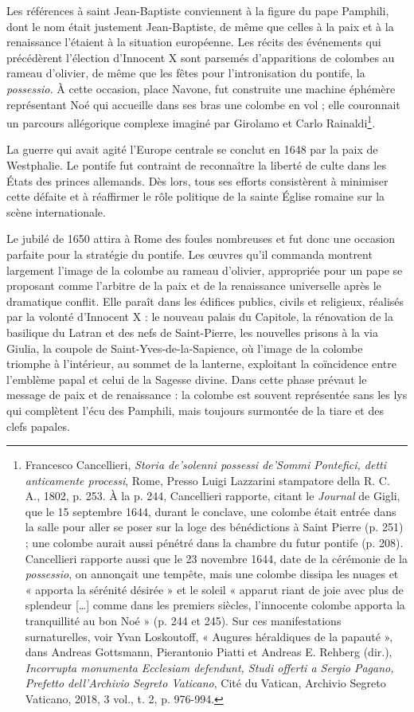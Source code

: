 \documentclass[12pt,twoside,openany]{book}
\begin{document}
Les références à saint Jean-Baptiste conviennent à la figure du pape Pamphili, dont le nom était justement Jean-Baptiste, de même que celles à la paix et à la renaissance l’étaient à la situation européenne. Les récits des événements qui précédèrent l’élection d’Innocent X sont parsemés d’apparitions de colombes au rameau d’olivier, de même que les fêtes pour l’intronisation du pontife, la \textit{possessio. }À cette occasion, place Navone, fut construite une machine éphémère représentant Noé qui accueille dans ses bras une colombe en vol ; elle couronnait un parcours allégorique complexe imaginé par Girolamo et Carlo Rainaldi\footnote{Francesco Cancellieri, \textit{Storia de’solenni possessi de’Sommi Pontefici, detti anticamente processi}, Rome, Presso Luigi Lazzarini stampatore della R. C. A., 1802, p. 253. À la p. 244, Cancellieri rapporte, citant le \textit{Journal }de Gigli, que le 15 septembre 1644, durant le conclave, une colombe était entrée dans la salle pour aller se poser sur la loge des bénédictions à Saint Pierre (p. 251) ; une colombe aurait aussi pénétré dans la chambre du futur pontife (p. 208). Cancellieri rapporte aussi que le 23 novembre 1644, date de la cérémonie de la \textit{possessio}, on annonçait une tempête, mais une colombe dissipa les nuages et « apporta la sérénité désirée » et le soleil « apparut riant de joie avec plus de splendeur […] comme dans les premiers siècles, l’innocente colombe apporta la tranquillité au bon Noé » (p. 244 et 245). Sur ces manifestations surnaturelles, voir Yvan Loskoutoff, « Augures héraldiques de la papauté », dans Andreas Gottsmann, Pierantonio Piatti et Andreas E. Rehberg (dir.), \textit{Incorrupta monumenta Ecclesiam defendunt, Studi offerti a Sergio Pagano, Prefetto dell’Archivio Segreto Vaticano}, Cité du Vatican, Archivio Segreto Vaticano, 2018, 3 vol., t. 2, p. 976-994.}.

La guerre qui avait agité l’Europe centrale se conclut en 1648 par la paix de Westphalie. Le pontife fut contraint de reconnaître la liberté de culte dans les États des princes allemands. Dès lors, tous ses efforts consistèrent à minimiser cette défaite et à réaffirmer le rôle politique de la sainte Église romaine sur la scène internationale.

Le jubilé de 1650 attira à Rome des foules nombreuses et fut donc une occasion parfaite pour la stratégie du pontife. Les œuvres qu’il commanda montrent largement l’image de la colombe au rameau d’olivier, appropriée pour un pape se proposant comme l’arbitre de la paix et de la renaissance universelle après le dramatique conflit. Elle paraît dans les édifices publics, civils et religieux, réalisés par la volonté d’Innocent X : le nouveau palais du Capitole, la rénovation de la basilique du Latran et des nefs de Saint-Pierre, les nouvelles prisons à la via Giulia, la coupole de Saint-Yves-de-la-Sapience, où l’image de la colombe triomphe à l’intérieur, au sommet de la lanterne, exploitant la coïncidence entre l’emblème papal et celui de la Sagesse divine. Dans cette phase prévaut le message de paix et de renaissance : la colombe est souvent représentée sans les lys qui complètent l’écu des Pamphili, mais toujours surmontée de la tiare et des clefs papales.
\end{document}
